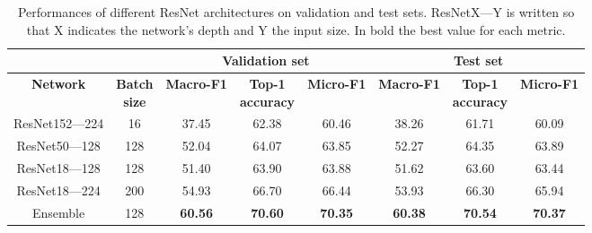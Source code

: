 \begin{table}[htbp]
  \centering
  \normalsize
  \caption[Performances of different ResNet architectures on validation and test sets]{Performances of different ResNet architectures on validation and test sets. ResNetX---Y is written so that X indicates the network’s depth and Y the input size. In bold the best value for each metric.}
  \label{table1.3}
    \begin{tabular}{*{2}{c}|*{3}{c}|*{3}{c}}
        \toprule
        \multicolumn{2}{c}{\textbf{}}                      & \multicolumn{3}{c}{\textbf{Validation set}}                     & \multicolumn{3}{c}{\textbf{Test set}}                           \\ \midrule
        \textbf{Network} & \makecell{\textbf{Batch} \\ \textbf{size}} & \textbf{Macro-F1} & \makecell{\textbf{Top-1} \\ \textbf{accuracy}} & \textbf{Micro-F1} & \textbf{Macro-F1} & \makecell{\textbf{Top-1} \\ \textbf{accuracy}} & \textbf{Micro-F1} \\
        \midrule
        ResNet152---224                & 16                  & 37.45             & 62.38                   & 60.46             & 38.26             & 61.71                   & 60.09             \\
        ResNet50---128                 & 128                 & 52.04             & 64.07                   & 63.85             & 52.27             & 64.35                   & 63.89             \\
        ResNet18---128                 & 128                 & 51.40             & 63.90                   & 63.88             & 51.62             & 63.60                   & 63.44             \\
        ResNet18---224                 & 200                 & 54.93             & 66.70                   & 66.44             & 53.93             & 66.30                   & 65.94             \\
        Ensemble                     & 128                 & \textbf{60.56}    & \textbf{70.60}          & \textbf{70.35}    & \textbf{60.38}    & \textbf{70.54}          & \textbf{70.37}    \\ \bottomrule
    \end{tabular}
\end{table}


